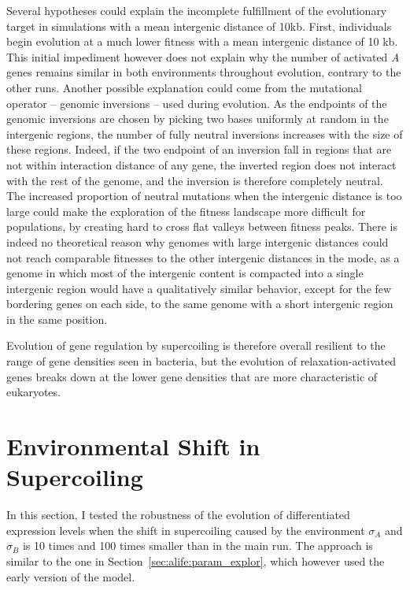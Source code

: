Several hypotheses could explain the incomplete fulfillment of the evolutionary target in simulations with a mean intergenic distance of 10kb.
First, individuals begin evolution at a much lower fitness with a mean intergenic distance of 10 kb.
This initial impediment however does not explain why the number of activated \emph{A} genes remains similar in both environments throughout evolution, contrary to the other runs.
Another possible explanation could come from the mutational operator -- genomic inversions -- used during evolution.
As the endpoints of the genomic inversions are chosen by picking two bases uniformly at random in the intergenic regions, the number of fully neutral inversions increases with the size of these regions.
Indeed, if the two endpoint of an inversion fall in regions that are not within interaction distance of any gene, the inverted region does not interact with the rest of the genome, and the inversion is therefore completely neutral.
The increased proportion of neutral mutations when the intergenic distance is too large could make the exploration of the fitness landscape more difficult for populations, by creating hard to cross flat valleys between fitness peaks.
There is indeed no theoretical reason why genomes with large intergenic distances could not reach comparable fitnesses to the other intergenic distances in the mode, as a genome in which most of the intergenic content is compacted into a single intergenic region would have a qualitatively similar behavior, except for the few bordering genes on each side, to the same genome with a short intergenic region in the same position.

Evolution of gene regulation by supercoiling is therefore overall resilient to the range of gene densities seen in bacteria, but the evolution of relaxation-activated genes breaks down at the lower gene densities that are more characteristic of eukaryotes.


\section{Environmental Shift in Supercoiling}
\label{sec:param:sigma-env}

In this section, I tested the robustness of the evolution of differentiated expression levels when the shift in supercoiling caused by the environment $\sigma_A$ and $\sigma_B$ is 10 times and 100 times smaller than in the main run.
The approach is similar to the one in Section~\ref{sec:alife:param_explor}, which however used the early version of the model.

